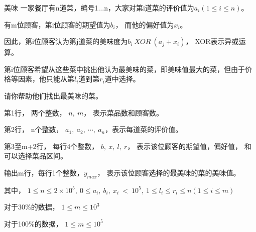 \begin{problem}{美味}
一家餐厅有n道菜，编号1$\dots$n，大家对第i道菜的评价值为$a_i (1 \leq i \leq n)$。

有m位顾客，第i位顾客的期望值为$b_i$， 而他的偏好值为$x_i$。

因此，第i位顾客认为第j道菜的美味度为$b_i\ XOR\ (a_j + x_i)$， XOR表示异或运算。

第i位顾客希望从这些菜中挑出他认为最美味的菜，即美味值最大的菜，但由于价格等因素，他只能从第$l_i$道到第$r_i$道中选择。

请你帮助他们找出最美味的菜。

\InputFile
第1行， 两个整数， $n,\ m$， 表示菜品数和顾客数。

第2行， n个整数， $a_1,\ a_2,\ \cdots,\ a_n$，表示每道菜的评价值。

第3至m+2行， 每行4个整数， $b,\ x,\ l,\ r$， 表示该位顾客的期望值，偏好值， 和可以选择菜品区间。

\OutputFile
输出m行，每行1个整数，$y_{max}$， 表示该位顾客选择的最美味的菜的美味值。

\Example
\begin{example}
%
\end{example}

\Note
其中， $1 \leq n \leq 2\times 10^5,\ 0 \leq a_i,\ b_i,\ x_i\ <\ 10 ^ 5,\ 1\leq l_i \leq r_i \leq n (1 \leq i \leq m)$
	
对于30\%的数据， $1 \leq  m \leq 10^3$
	
对于100\%的数据， $1 \leq m \leq 10^5$
\end{problem}

